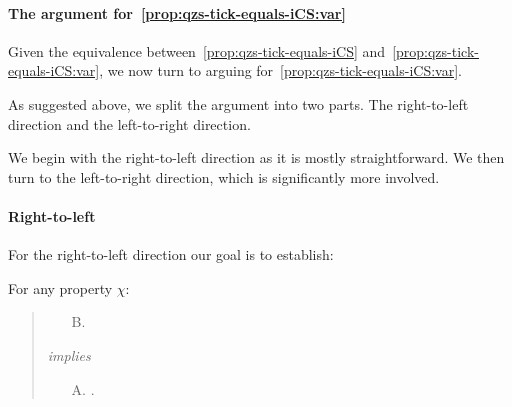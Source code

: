 



\paragraph*{The argument for~\autoref{prop:qzs-tick-equals-iCS:var}}

\begin{note}
  Given the equivalence between~\autoref{prop:qzs-tick-equals-iCS} and~\autoref{prop:qzs-tick-equals-iCS:var}, we now turn to arguing for~\autoref{prop:qzs-tick-equals-iCS:var}.

  As suggested above, we split the argument into two parts.
  The right-to-left direction and the left-to-right direction.

  We begin with the right-to-left direction as it is mostly straightforward.
  We then turn to the left-to-right direction, which is significantly more involved.
\end{note}

\paragraph*{Right-to-left}

\begin{note}
  For the right-to-left direction our goal is to establish:

  For any property \(\chi\):
  \begin{quote}
  \begin{enumerate}
    \item[B.]
    \end{enumerate}
    \emph{implies}
    \begin{enumerate}
    \item[A.]
      .
    \end{enumerate}
  \end{quote}
\end{note}

